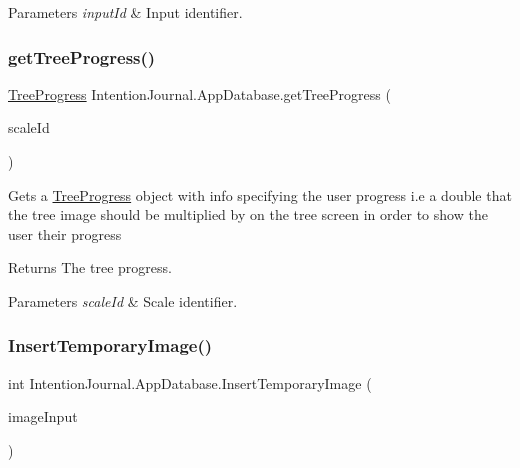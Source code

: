 \begin{DoxyParams}{Parameters}
{\em input\+Id} & Input identifier.\\
\hline
\end{DoxyParams}
\mbox{\label{class_intention_journal_1_1_app_database_ab9fd2bf2734c6e0e57380ee0b65a19e5}} 
\subsubsection{\texorpdfstring{get\+Tree\+Progress()}{getTreeProgress()}}
{\footnotesize\ttfamily \hyperlink{class_intention_journal_1_1_tree_progress}{Tree\+Progress} Intention\+Journal.\+App\+Database.\+get\+Tree\+Progress (\begin{DoxyParamCaption}\item[{int}]{scale\+Id }\end{DoxyParamCaption})\hspace{0.3cm}{\ttfamily [inline]}}



Gets a \hyperlink{class_intention_journal_1_1_tree_progress}{Tree\+Progress} object with info specifying the user progress i.\+e a double that the tree image should be multiplied by on the tree screen in order to show the user their progress 

\begin{DoxyReturn}{Returns}
The tree progress.
\end{DoxyReturn}

\begin{DoxyParams}{Parameters}
{\em scale\+Id} & Scale identifier.\\
\hline
\end{DoxyParams}
\mbox{\label{class_intention_journal_1_1_app_database_ab5b4992848a3a24724176335ea1f02fd}} 
\subsubsection{\texorpdfstring{Insert\+Temporary\+Image()}{InsertTemporaryImage()}}
{\footnotesize\ttfamily int Intention\+Journal.\+App\+Database.\+Insert\+Temporary\+Image (\begin{DoxyParamCaption}\item[{\hyperlink{class_intention_journal_1_1_image_data_object}{Image\+Data\+Object}}]{image\+Input }\end{DoxyParamCaption})\hspace{0.3cm}{\ttfamily [inline]}}



